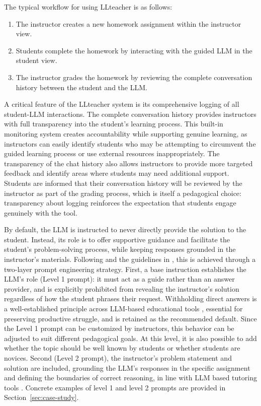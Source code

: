 \documentclass[
  12pt]{article}
\begin{document}
The typical workflow for using LLteacher is as follows:
\begin{enumerate}
    \item The instructor creates a new homework assignment within the instructor view.
    \item Students complete the homework by interacting with the guided LLM in the student view.
    \item The instructor grades the homework by reviewing the complete conversation history between the student and the LLM.
\end{enumerate}

A critical feature of the LLteacher system is its comprehensive logging of all student-LLM interactions.
The complete conversation history provides instructors with full transparency into the student's learning process.
This built-in monitoring system creates accountability while supporting genuine learning, as instructors can easily identify students who may be attempting to circumvent the guided learning process or use external resources inappropriately.
The transparency of the chat history also allows instructors to provide more targeted feedback and identify areas where students may need additional support.
Students are informed that their conversation history will be reviewed by the instructor as part of the grading process, which is itself a pedagogical choice: transparency about logging reinforces the expectation that students engage genuinely with the tool.

By default, the LLM is instructed to never directly provide the solution to the student. Instead, its role is to offer supportive guidance and facilitate the student's problem-solving process, while keeping responses grounded in the instructor's materials. Following \citet{liu2025lpitutor} and the guidelines in \citet{stamper2024enhancing}, this is achieved through a two-layer prompt engineering strategy. First, a base instruction establishes the LLM's role (Level 1 prompt): it must act as a guide rather than an answer provider, and is explicitly prohibited from revealing the instructor's solution regardless of how the student phrases their request. Withholding direct answers is a well-established principle across LLM-based educational tools \citep{kazemitabaar2024codeaid, stamper2024enhancing}, essential for preserving productive struggle, and is retained as the recommended default. Since the Level 1 prompt can be customized by instructors, this behavior can be adjusted to suit different pedagogical goals. At this level, it is also possible to add whether the topic should be well known by students or whether students are novices. Second (Level 2 prompt), the instructor's problem statement and solution are included, grounding the LLM's responses in the specific assignment and defining the boundaries of correct reasoning, in line with LLM based tutoring tools \citep{kazemitabaar2024codeaid, hobert-berens-2024}. Concrete examples of level 1 and level 2 prompts are provided in Section~\ref{sec:case-study}.
\end{document}

